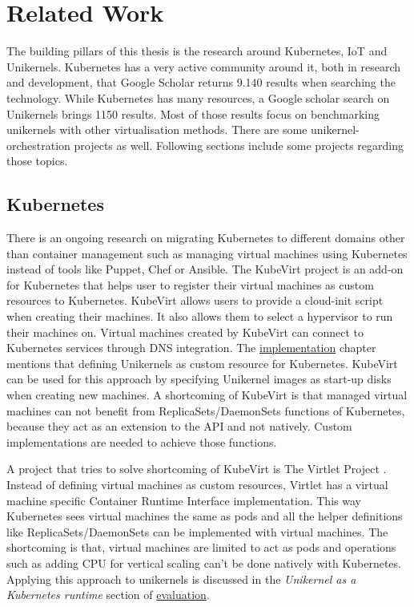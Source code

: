 
\chapter{Related Work}\label{chapter:literature}
The building pillars of this thesis is the research around Kubernetes, IoT and Unikernels. Kubernetes has a very active community around it, both in research and development, that Google Scholar returns 9.140 results when searching the technology. While Kubernetes has many resources, a Google scholar search on Unikernels brings 1150 results. Most of those results focus on benchmarking unikernels with other virtualisation methods. There are some unikernel-orchestration projects as well. Following sections include some projects regarding those topics.

\section*{Kubernetes}

There is an ongoing research on migrating Kubernetes to different domains other than container management such as managing virtual machines using Kubernetes instead of tools like Puppet, Chef or Ansible. The KubeVirt project \cite{kubevirt} is an add-on for Kubernetes that helps user to register their virtual machines as custom resources to Kubernetes. KubeVirt allows users to provide a cloud-init script when creating their machines. It also allows them to select a hypervisor to run their machines on. Virtual machines created by KubeVirt can connect to Kubernetes services through DNS integration. The \hyperref[chapter:implementation]{implementation} chapter mentions that defining Unikernels as custom resource for Kubernetes. KubeVirt can be used for this approach by specifying Unikernel images as start-up disks when creating new machines. A shortcoming of KubeVirt is that managed virtual machines can not benefit from ReplicaSets/DaemonSets functions of Kubernetes, because they act as an extension to the API and not natively. Custom implementations are needed to achieve those functions.

A project that tries to solve shortcoming of KubeVirt is The Virtlet Project \cite{virtlet}. Instead of defining virtual machines as custom resources, Virtlet has a virtual machine specific Container Runtime Interface implementation. This way Kubernetes sees virtual machines the same as pods and all the helper definitions like ReplicaSets/DaemonSets can be implemented with virtual machines. The shortcoming is that, virtual machines are limited to act as pods and operations such as adding CPU for vertical scaling can't be done natively with Kubernetes. Applying this approach to unikernels is discussed in the \textit{Unikernel as a Kubernetes runtime} section of \hyperref[chapter:evaluation]{evaluation}.


